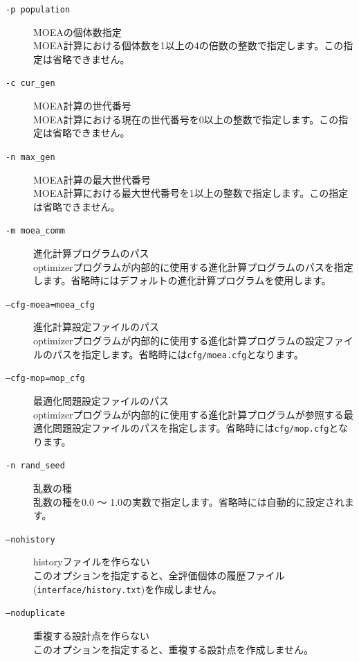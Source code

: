 \documentclass[a4paper,11pt]{jarticle}
\begin{document}
{\begin{description}
\begin{description}
\item[{\tt -p  population}] MOEAの個体数指定\\
MOEA計算における個体数を1以上の4の倍数の整数で指定します。この指定は省略できません。\\

\item[{\tt -c cur\_gen}] MOEA計算の世代番号\\
MOEA計算における現在の世代番号を0以上の整数で指定します。この指定は省略できません。\\

\item[{\tt -n max\_gen}] MOEA計算の最大世代番号\\
MOEA計算における最大世代番号を1以上の整数で指定します。この指定は省略できません。\\

\item[{\tt -m moea\_comm}] 進化計算プログラムのパス\\
optimizerプログラムが内部的に使用する進化計算プログラムのパスを指定します。省略時にはデフォルトの進化計算プログラムを使用します。

\item[{\tt --cfg-moea=moea\_cfg}] 進化計算設定ファイルのパス\\
optimizerプログラムが内部的に使用する進化計算プログラムの設定ファイルのパスを指定します。省略時には{\tt cfg/moea.cfg}となります。\\

\item[{\tt --cfg-mop=mop\_cfg}] 最適化問題設定ファイルのパス\\
optimizerプログラムが内部的に使用する進化計算プログラムが参照する最適化問題設定ファイルのパスを指定します。省略時には{\tt cfg/mop.cfg}となります。\\

\item[{\tt -n rand\_seed}] 乱数の種\\
乱数の種を0.0 〜 1.0の実数で指定します。省略時には自動的に設定されます。\\

\item[{\tt --nohistory}] historyファイルを作らない\\
このオプションを指定すると、全評価個体の履歴ファイル({\tt interface/history.txt})を作成しません。\\

\item[{\tt --noduplicate}] 重複する設計点を作らない\\
このオプションを指定すると、重複する設計点を作成しません。\\


\end{description}
\end{description}}
\end{document}
